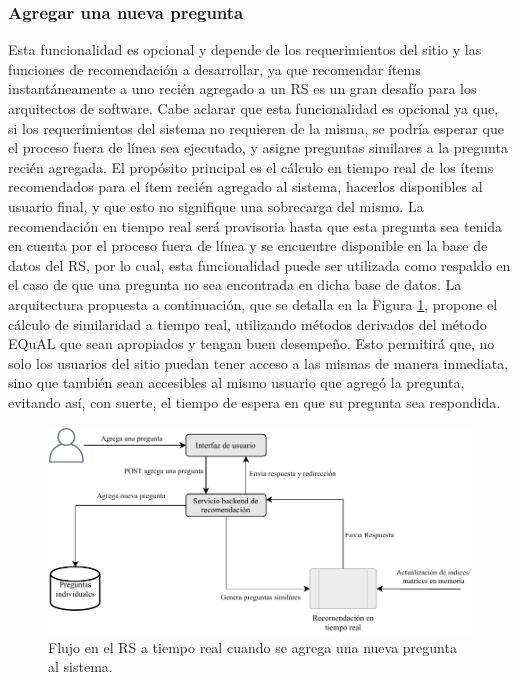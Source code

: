 \subsubsection{Agregar una nueva pregunta}
Esta funcionalidad es opcional y depende de los requerimientos del sitio y las funciones de recomendación a desarrollar, ya que recomendar ítems instantáneamente a uno recién agregado a un RS es un gran desafío para los arquitectos de software. Cabe aclarar que esta funcionalidad es opcional ya que, si los requerimientos del sistema no requieren de la misma, se podría esperar que el proceso fuera de línea sea ejecutado, y asigne preguntas similares a la pregunta recién agregada. El propósito principal es el cálculo en tiempo real de los ítems recomendados para el ítem recién agregado al sistema, hacerlos disponibles al usuario final, y que esto no signifique una sobrecarga del mismo. La recomendación en tiempo real será provisoria hasta que esta pregunta sea tenida en cuenta por el proceso fuera de línea y se encuentre disponible en la base de datos del RS, por lo cual, esta funcionalidad puede ser utilizada como respaldo en el caso de que una pregunta no sea encontrada en dicha base de datos. La arquitectura propuesta a continuación, que se detalla en la Figura \ref{fig:implementacionrsagregar}, propone el cálculo de similaridad a tiempo real, utilizando métodos derivados del método EQuAL que sean apropiados y tengan buen desempeño. Esto permitirá que, no solo los usuarios del sitio puedan tener acceso a las mismas de manera inmediata, sino que también sean accesibles al mismo usuario que agregó la pregunta, evitando así, con suerte, el tiempo de espera en que su pregunta sea respondida.

\begin{figure}[h!]
	\centering
	\includegraphics[width=0.9\linewidth]{8_problema_investigacion/imagenes/implementacion_rs_agregar}
	\caption{Flujo en el RS a tiempo real cuando se agrega una nueva pregunta al sistema.}
	\label{fig:implementacionrsagregar}
\end{figure}


